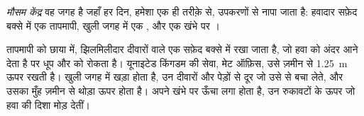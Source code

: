 \begin{definition}[मौसम केंद्र]\label{def:g4:clouds-rain-snow:weather-station}
\emph{मौसम केंद्र} वह जगह है जहाँ हर दिन, हमेशा एक ही
तरीक़े से, उपकरणों से  नापा जाता है: हवादार सफ़ेद बक्से में एक तापमापी,
खुली जगह में एक , और एक खंभे पर ।
\end{definition}

तापमापी को छाया में, झिलमिलीदार दीवारों वाले एक सफ़ेद बक्से में रखा जाता है,
जो हवा को अंदर आने देता है पर धूप और  को रोकता है। यूनाइटेड किंगडम की
 सेवा, मेट ऑफ़िस, उसे ज़मीन से \SI{1.25}{\metre} ऊपर रखती है। 
खुली जगह में खड़ा होता है, उन दीवारों और पेड़ों से दूर जो उसे  से बचा लेते,
और उसका मुँह ज़मीन से थोड़ा ऊपर होता है।  अपने खंभे पर ऊँचा लगा
होता है, उन रुकावटों के ऊपर जो हवा की दिशा मोड़ देतीं।

